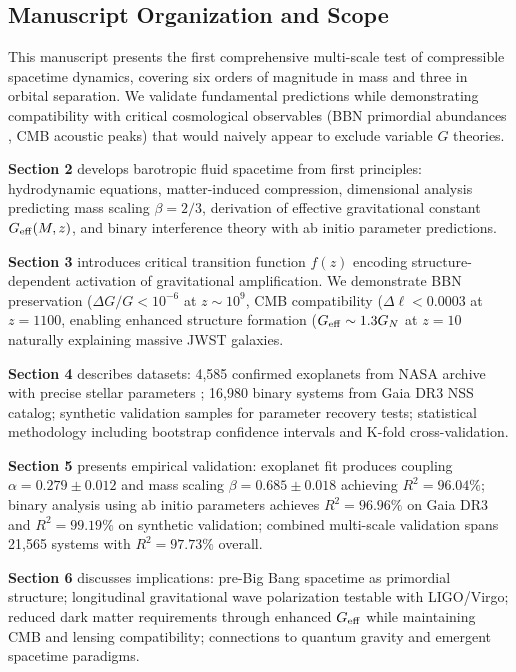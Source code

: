 \documentclass[11pt,a4paper]{article}
\begin{document}
\hypertarget{manuscript-organization-and-scope}{%
\subsection{Manuscript Organization and
Scope}\label{manuscript-organization-and-scope}}

This manuscript presents the first comprehensive multi-scale test of
compressible spacetime dynamics, covering six orders of magnitude in
mass and three in orbital separation. We validate fundamental
predictions while demonstrating compatibility with critical cosmological
observables (BBN primordial abundances \cite{Pitrou2018}, CMB acoustic peaks) that would
naively appear to exclude variable \(G\) theories.

\textbf{Section 2} develops barotropic fluid spacetime from first
principles: hydrodynamic equations, matter-induced compression,
dimensional analysis predicting mass scaling \(\beta = 2/3\), derivation
of effective gravitational constant \(G_{\rm eff}(M,z)\), and binary
interference theory with ab initio parameter predictions.

\textbf{Section 3} introduces critical transition function \(f(z)\)
encoding structure-dependent activation of gravitational amplification.
We demonstrate BBN preservation (\(\Delta G/G < 10^{-6}\) at
\(z \sim 10^9\), CMB compatibility (\(\Delta\ell < 0.0003\) at
\(z=1100\), enabling enhanced structure formation
(\(G_{\rm eff} \sim 1.3 G_N\) at \(z=10\) naturally explaining massive
JWST galaxies.

\textbf{Section 4} describes datasets: 4,585 confirmed exoplanets from
NASA archive with precise stellar parameters \cite{Bruntt2010}; 16,980 binary systems from
Gaia DR3 NSS catalog; synthetic validation samples for parameter
recovery tests; statistical methodology including bootstrap confidence
intervals and K-fold cross-validation.

\textbf{Section 5} presents empirical validation: exoplanet fit produces
coupling \(\alpha = 0.279 \pm 0.012\) and mass scaling
\(\beta = 0.685 \pm 0.018\) achieving \(R^2 = 96.04\%\); binary analysis
using ab initio parameters achieves \(R^2 = 96.96\%\) on Gaia DR3 and
\(R^2 = 99.19\%\) on synthetic validation; combined multi-scale
validation spans 21,565 systems with \(R^2 = 97.73\%\) overall.

\textbf{Section 6} discusses implications: pre-Big Bang spacetime as
primordial structure; longitudinal gravitational wave polarization
testable with LIGO/Virgo; reduced dark matter requirements through
enhanced \(G_{\rm eff}\) while maintaining CMB and lensing
compatibility; connections to quantum gravity and emergent spacetime
paradigms.
\end{document}
